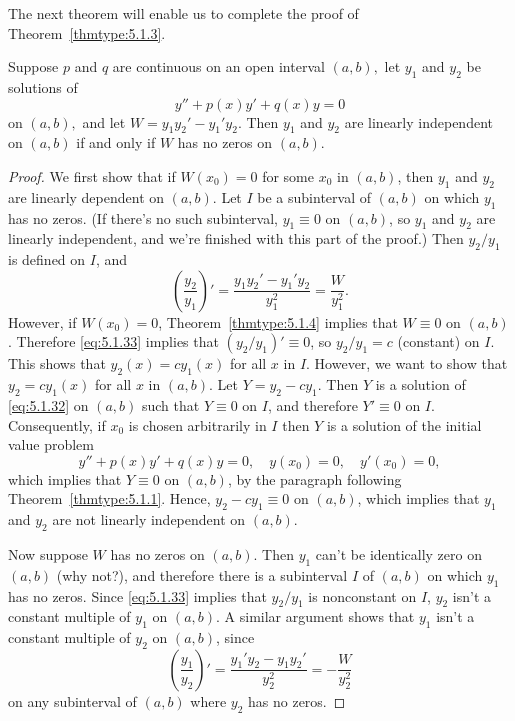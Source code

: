 \documentclass{ximera}
\begin{document}
 
 
The next theorem will enable us to complete the proof of
Theorem~\ref{thmtype:5.1.3}.
 
\begin{theorem}\label{thmtype:5.1.5}
 Suppose  $p$ and $q$ are continuous on an open interval $(a,b),$
 let $y_1$ and $y_2$ be solutions of
\begin{equation}\label{eq:5.1.32}
y''+p(x)y'+q(x)y=0
\end{equation}
on  $(a,b),$ and let $W=y_1y_2'-y_1'y_2.$
Then $y_1$ and $y_2$ are linearly independent on  $(a,b)$ if and only
if $W$ has no zeros on  $(a,b).$
\end{theorem}
 
\begin{proof}
We first show that if $W(x_0)=0$ for some $x_0$ in  $(a,b)$, then
$y_1$ and $y_2$ are linearly dependent on  $(a,b)$.  Let $I$ be a
subinterval
of  $(a,b)$ on which $y_1$ has no zeros. (If there's no such
subinterval, $y_1\equiv0$ on  $(a,b)$, so $y_1$ and $y_2$
are linearly independent, and we're finished with this part of the
proof.) Then $y_2/y_1$ is defined on $I$, and
\begin{equation}\label{eq:5.1.33}
\left(\frac{y_2}{y_1}\right)'=\frac{y_1y_2'-y_1'y_2}{y_1^2}=\frac{W}{y_1^2}.
\end{equation}
However, if $W(x_0)=0$,
 Theorem~\ref{thmtype:5.1.4} implies that $W\equiv0$ on  $(a,b)$.
Therefore \eqref{eq:5.1.33} implies that  $(y_2/y_1)'\equiv0$, so
$y_2/y_1=c$ (constant) on $I$. This shows that $y_2(x)=cy_1(x)$
for all $x$ in $I$. However, we want to show that $y_2=cy_1(x)$
for all $x$ in  $(a,b)$.
Let $Y=y_2-cy_1$. Then $Y$ is a solution of \eqref{eq:5.1.32}
on  $(a,b)$ such that $Y\equiv0$ on $I$, and therefore $Y'\equiv0$ on
$I$. Consequently, if $x_0$  is chosen arbitrarily in  $I$ then
$Y$ is a solution of the initial value problem
$$
y''+p(x)y'+q(x)y=0,\quad y(x_0)=0,\quad y'(x_0)=0,
$$
which implies that $Y\equiv0$ on  $(a,b)$,
by the paragraph following
Theorem~\ref{thmtype:5.1.1}. %
 Hence, $y_2-cy_1\equiv0$
on  $(a,b)$, which implies that $y_1$ and $y_2$ are not linearly
independent on  $(a,b)$.
 
Now suppose   $W$ has no zeros on  $(a,b)$.  Then $y_1$
can't be identically zero on  $(a,b)$ (why not?), and therefore there
is a subinterval $I$ of  $(a,b)$ on which $y_1$ has no zeros. Since
\eqref{eq:5.1.33} implies that $y_2/y_1$ is nonconstant on $I$,
$y_2$ isn't  a constant multiple of $y_1$ on  $(a,b)$.
A similar argument shows that $y_1$ isn't  a constant multiple of
$y_2$ on  $(a,b)$, since
$$
\left(\frac{y_1}{y_2}\right)'=\frac{y_1'y_2-y_1y_2'}{y_2^2}=-\frac{W}{y_2^2}
$$
on any subinterval of  $(a,b)$ where $y_2$ has no zeros.
\end{proof}
\end{document}
